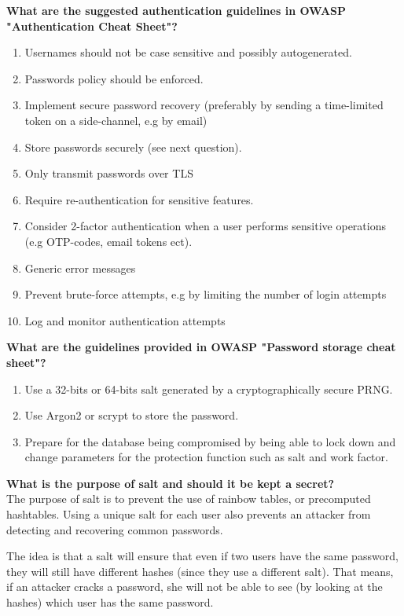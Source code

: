 \documentclass{article}
\begin{document}
\textbf{What are the suggested authentication guidelines in OWASP "Authentication Cheat Sheet"?}
\begin{enumerate}
    \item Usernames should not be case sensitive and possibly autogenerated.
    \item Passwords policy should be enforced.
    \item Implement secure password recovery (preferably by sending a time-limited token on a side-channel, e.g by email)
    \item Store passwords securely (see next question).
    \item Only transmit passwords over TLS
    \item Require re-authentication for sensitive features.
    \item Consider 2-factor authentication when a user performs sensitive operations (e.g OTP-codes, email tokens ect).
    \item Generic error messages
    \item Prevent brute-force attempts, e.g by limiting the number of login attempts
    \item Log and monitor authentication attempts
\end{enumerate}

\textbf{What are the guidelines provided in OWASP "Password storage cheat sheet"?}
\begin{enumerate}
    \item Use a 32-bits or 64-bits salt generated by a cryptographically secure PRNG.
    \item Use Argon2 or scrypt to store the password.
    \item Prepare for the database being compromised by being able to lock down and change parameters for the protection function such as salt and work factor.
\end{enumerate}
\textbf{What is the purpose of salt and should it be kept a secret?}\\
The purpose of salt is to prevent the use of rainbow tables, or precomputed hashtables. Using a unique salt for each user also prevents an attacker from detecting and recovering common passwords. 

The idea is that a salt will ensure that even if two users have the same password, they will still have different hashes (since they use a different salt). That means, if an attacker cracks a password, she will not be able to see (by looking at the hashes) which user has the same password.
\end{document}
